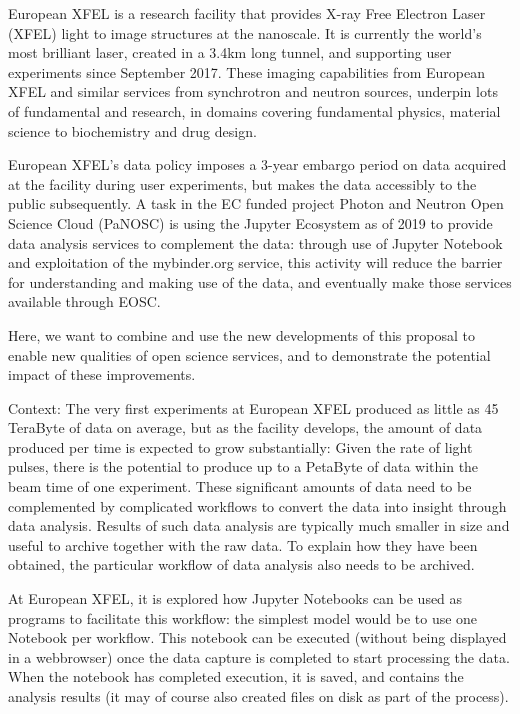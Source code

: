 \begin{task}[
  title=Reproducible X-ray crystallography workflows at European XFEL,
  id=reproducibility-euxfel,
  lead=XFEL,
  PM=36,
  wphases={6-48},
  partners={XFEL}
  ]

  European XFEL is a research facility that provides X-ray Free
  Electron Laser (XFEL) light to image structures at the nanoscale. It
  is currently the world's most brilliant laser, created in a 3.4km
  long tunnel, and supporting user experiments since September
  2017. These imaging capabilities from European XFEL and similar
  services from synchrotron and neutron sources, underpin lots of
  fundamental and research, in domains covering fundamental physics,
  material science to biochemistry and drug design.

  European XFEL's data policy \cite{EuXFEL-datapolicy-2017} imposes a
  3-year embargo period on data acquired at the facility during user
  experiments, but makes the data accessibly to the public
  subsequently. A task in the EC funded project Photon and Neutron
  Open Science Cloud (PaNOSC) is using the Jupyter Ecosystem as of
  2019 to provide data analysis services to complement the data:
  through use of Jupyter Notebook and exploitation of the mybinder.org
  service, this activity will reduce the barrier for understanding and
  making use of the data, and eventually make those services available
  through EOSC.

  Here, we want to combine and use the new developments of this
  proposal to enable new qualities of open science services, and to
  demonstrate the potential impact of these improvements.

  \medskip Context: The very first experiments at European XFEL
  produced as little as 45 TeraByte of data on average, but as the
  facility develops, the amount of data produced per time is expected
  to grow substantially: Given the rate of light pulses, there is the
  potential to produce up to a PetaByte of data within the beam time
  of one experiment. These significant amounts of data need to be
  complemented by complicated workflows to convert the data into
  insight through data analysis. Results of such data analysis are
  typically much smaller in size and useful to archive together with
  the raw data. To explain how they have been obtained, the particular
  workflow of data analysis also needs to be archived.

  At European XFEL, it is explored how Jupyter Notebooks can be used
  as programs to facilitate this workflow: the simplest model would be
  to use one Notebook per workflow. This notebook can be executed
  (without being displayed in a webbrowser) once the data capture is
  completed to start processing the data. When the notebook has
  completed execution, it is saved, and contains the analysis results
  (it may of course also created files on disk as part of the
  process).


\end{task}
